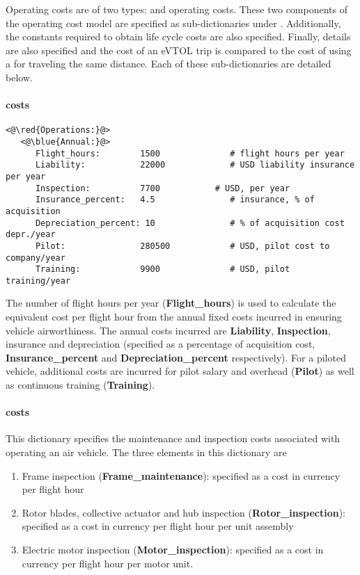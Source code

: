 \subsubsection{}
Operating costs are of two types:  and  operating costs. These two components of the operating cost model are specified as sub-dictionaries under . Additionally, the constants required to obtain  life cycle costs are also specified. Finally,  details are also specified and the cost of an eVTOL trip is compared to the cost of using a  for traveling the same distance. Each of these sub-dictionaries are detailed below.

\paragraph{ costs}
\begin{lstlisting}
<@\red{Operations:}@>
   <@\blue{Annual:}@>
      Flight_hours:        1500              # flight hours per year
      Liability:           22000             # USD liability insurance per year
      Inspection:          7700           # USD, per year
      Insurance_percent:   4.5               # insurance, % of acquisition 
      Depreciation_percent: 10               # % of acquisition cost depr./year
      Pilot:               280500            # USD, pilot cost to company/year
      Training:            9900              # USD, pilot training/year
\end{lstlisting}

The number of flight hours per year (\textbf{Flight\_hours}) is used to calculate the equivalent cost per flight hour from the annual fixed costs incurred in ensuring vehicle airworthiness. The annual costs incurred are \textbf{Liability}, \textbf{Inspection}, insurance and depreciation (specified as a percentage of acquisition cost, \textbf{Insurance\_percent} and \textbf{Depreciation\_percent} respectively). For a piloted vehicle, additional costs are incurred for pilot salary and overhead (\textbf{Pilot}) as well as continuous training (\textbf{Training}). 

\paragraph{ costs}
This dictionary specifies the maintenance and inspection costs associated with operating an air vehicle. The three elements in this dictionary are 
\begin{enumerate}
\item Frame inspection (\textbf{Frame\_maintenance}): specified as a cost in currency per flight hour
\item Rotor blades, collective actuator and hub inspection (\textbf{Rotor\_inspection}): specified as a cost in currency per flight hour per unit assembly
\item Electric motor inspection (\textbf{Motor\_inspection}): specified as a cost in currency per flight hour per motor unit.
\end{enumerate}


